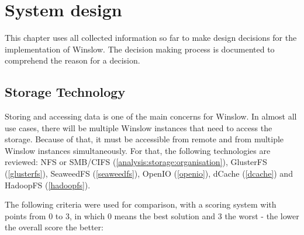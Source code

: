 \chapter{System design}

This chapter uses all collected information so far to make design decisions for the implementation of Winslow.
The  decision making process is documented to comprehend the reason for a decision.


\section{Storage Technology}

Storing and accessing data is one of the main concerns for Winslow.
In almost all use cases, there will be multiple Winslow instances that need to access the storage.
Because of that, it must be accessible from remote and from multiple Winslow instances simultaneously.
For that, the following technologies are reviewed: NFS or SMB/CIFS (\autoref{analysis:storage:organisation}),  GlusterFS (\autoref{glusterfs}), SeaweedFS (\autoref{seaweedfs}), OpenIO (\autoref{openio}), dCache (\autoref{dcache}) and HadoopFS (\autoref{hadoopfs}).

The following criteria were used for comparison, with a scoring system with points from 0 to 3, in which 0 means the best solution and 3 the worst - the lower the overall score the better:

